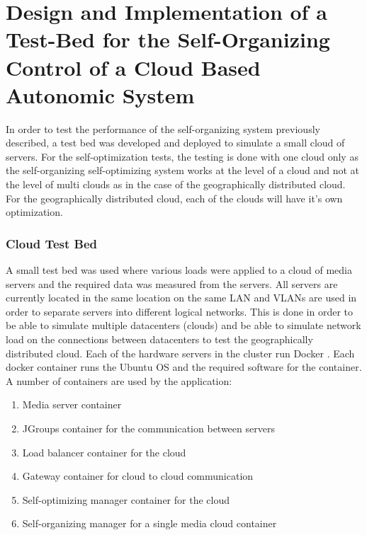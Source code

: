 \chapter{Design and Implementation of a Test-Bed for the Self-Organizing Control of a Cloud Based Autonomic System} %
\label{Chapter5}

In order to test the performance of the self-organizing system previously described, a test bed was developed and deployed to simulate a small cloud of servers. For the self-optimization tests, the testing is done with one cloud only as the self-organizing self-optimizing system works at the level of a cloud and not at the level of multi clouds as in the case of the geographically distributed cloud. For the geographically distributed cloud, each of the clouds will have it's own optimization.

\subsection{Cloud Test Bed}

A small test bed was used where various loads were applied to a cloud of media servers and the required data was measured from the servers. All servers are currently located in the same location on the same LAN and VLANs are used in order to separate servers into different logical networks. This is done in order to be able to simulate multiple datacenters (clouds) and be able to simulate network load on the connections between datacenters to test the geographically distributed cloud. Each of the hardware servers in the cluster run Docker \cite{cloud:docker}. Each docker container runs the Ubuntu OS and the required software for the container. A number of containers are used by the application:

\begin{enumerate}
	\item Media server container
	\item JGroups container for the communication between servers
	\item Load balancer container for the cloud
	\item Gateway container for cloud to cloud communication
	\item Self-optimizing manager container for the cloud
	\item Self-organizing manager for a single media cloud container
\end{enumerate}

